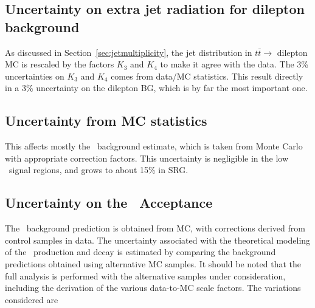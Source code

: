 \subsection{Uncertainty on extra jet radiation for dilepton
  background}
As discussed in Section~\ref{sec:jetmultiplicity}, the 
jet distribution in
$t\bar{t} \to$
dilepton MC is rescaled by the factors $K_3$ and $K_4$ to make 
it agree with the data.  The 3\% uncertainties on $K_3$ and $K_4$
comes from data/MC statistics.  This  
result directly in a 3\% uncertainty on the dilepton BG, which is by far 
the most important one.

\subsection{Uncertainty from MC statistics}
This affects mostly the \ttll\ background estimate, which is taken
from
Monte Carlo with appropriate correction factors.  This uncertainty
is negligible in the low \met\ signal regions, and grows to about
15\% in SRG.


\subsection{Uncertainty on the \ttll\ Acceptance}

The \ttbar\ background prediction is obtained from MC, with corrections
derived from control samples in data. The uncertainty associated with
the theoretical modeling of the \ttbar\ production and decay is
estimated by comparing the background predictions obtained using 
alternative MC samples. It should be noted that the full analysis is
performed with the alternative samples under consideration, 
including the derivation of the various data-to-MC scale factors. 
The variations considered are

